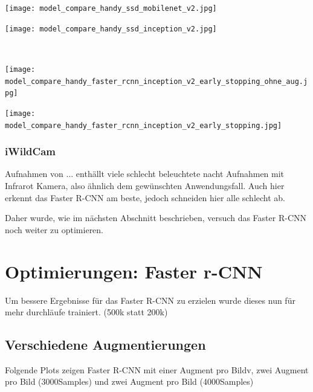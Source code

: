 \begin{minipage}{0.5\textwidth}
  \centering
  \texttt{[image: model\_compare\_handy\_ssd\_mobilenet\_v2.jpg]}
  \label{}
\end{minipage}
\begin{minipage}{0.5\textwidth}
  \centering
  \texttt{[image: model\_compare\_handy\_ssd\_inception\_v2.jpg]}
  \label{}
\end{minipage}
\\[1cm]
\begin{minipage}{0.5\textwidth}
  \centering
  \texttt{[image: model\_compare\_handy\_faster\_rcnn\_inception\_v2\_early\_stopping\_ohne\_aug.jpg]}
  \label{}
\end{minipage}
\begin{minipage}{0.5\textwidth}
  \centering
  \texttt{[image: model\_compare\_handy\_faster\_rcnn\_inception\_v2\_early\_stopping.jpg]}
  \label{}
\end{minipage}


\subsubsection{iWildCam}

Aufnahmen von ... enthällt viele schlecht beleuchtete nacht Aufnahmen 
mit Infrarot Kamera, also ähnlich dem gewünschten Anwendungsfall.
Auch hier erkennt das Faster R-CNN am beste, jedoch 
schneiden hier alle schlecht ab.

Daher wurde, wie im nächsten Abschnitt beschrieben, versuch
das Faster R-CNN noch weiter zu optimieren.


\section{Optimierungen: Faster r-CNN}\label{sec:optimierung_faster_rcnn}

Um bessere Ergebnisse für das Faster R-CNN zu erzielen wurde dieses 
nun für mehr durchläufe trainiert. (500k statt 200k)

\subsection{Verschiedene Augmentierungen}

Folgende Plots zeigen Faster R-CNN mit einer Augment pro 
Bildv, zwei Augment pro Bild (3000Samples) und 
zwei Augment pro Bild (4000Samples)
\\[1cm]
\begin{minipage}{0.5\textwidth}
  \centering
  \label{plot:map_diff_aug}
  \def\svgwidth{0.9\textwidth}
  
\end{minipage}
\begin{minipage}{0.5\textwidth}
  \centering
  \label{plot:loss_diff_aug}
  \def\svgwidth{0.9\textwidth}
  
\end{minipage}

